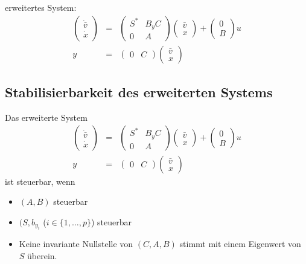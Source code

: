 erweitertes System:
\begin{eqnarray}
    \begin{pmatrix} \dot{\bar{v}} \\ \dot{x} \end{pmatrix} &=&
        \begin{pmatrix} S^* & B_y C \\ 0 & A \end{pmatrix}
        \begin{pmatrix} \bar{v} \\ x \end{pmatrix} +
        \begin{pmatrix} 0 \\ B \end{pmatrix} u \\
    y &=& \begin{pmatrix} 0 & C \end{pmatrix}
        \begin{pmatrix} \bar{v} \\ x \end{pmatrix}
\end{eqnarray}

\subsection{Stabilisierbarkeit des erweiterten Systems}
Das erweiterte System
\begin{eqnarray}
    \begin{pmatrix} \dot{\bar{v}} \\ \dot{x} \end{pmatrix} &=&
        \begin{pmatrix} S^* & B_y C \\ 0 & A \end{pmatrix}
        \begin{pmatrix} \bar{v} \\ x \end{pmatrix} +
        \begin{pmatrix} 0 \\ B \end{pmatrix} u \\
    y &=& \begin{pmatrix} 0 & C \end{pmatrix}
        \begin{pmatrix} \bar{v} \\ x \end{pmatrix}
\end{eqnarray}
ist steuerbar, wenn
\begin{itemize}
    \item $(A, B)$ steuerbar
    \item $(S, b_{y_i}$ ($i \in \{1, \ldots, p\}$) steuerbar
    \item Keine invariante Nullstelle von $(C, A, B)$ stimmt mit einem
        Eigenwert von $S$ überein.
\end{itemize}

